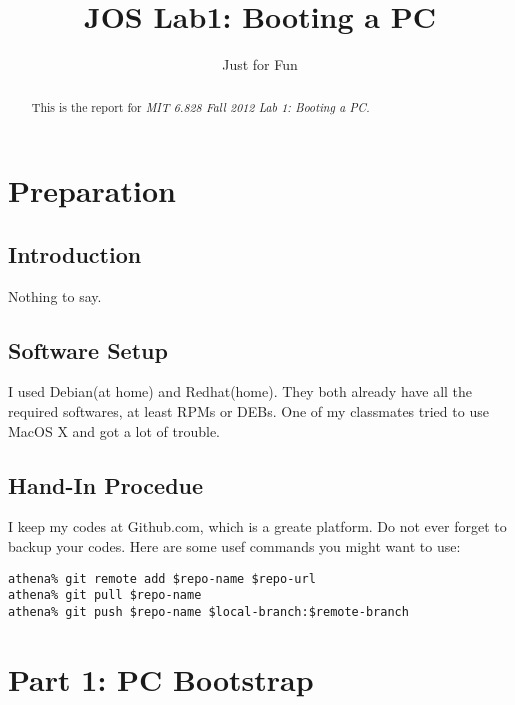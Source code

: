 \documentclass[10pt]{article}
\begin{document}

\title{JOS Lab1: Booting a PC}
\author{Just for Fun}
\maketitle
\thispagestyle{empty}

\begin{abstract}
This is the report for \emph{MIT 6.828 Fall 2012 Lab 1: Booting a PC.}
\end{abstract}

\section{Preparation}
	\subsection{Introduction}
		Nothing to say.
	
	\subsection{Software Setup}
		I used Debian(at home) and Redhat(home). They both already have all the required softwares, at least RPMs or DEBs. One of my classmates tried to use MacOS X and got a lot of trouble.
	
	\subsection{Hand-In Procedue}
		I keep my codes at Github.com, which is a greate platform. Do not ever forget to backup your codes. Here are some usef commands you might want to use:

\begin{lstlisting}
athena% git remote add $repo-name $repo-url
athena% git pull $repo-name
athena% git push $repo-name $local-branch:$remote-branch
\end{lstlisting}

\section{Part 1: PC Bootstrap}
\end{document}

